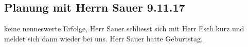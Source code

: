 \documentclass[a4paper,11pt]{article}
\begin{document}
\subsection{Planung mit Herrn Sauer 9.11.17}
keine nenneswerte Erfolge, Herr Sauer schliesst sich mit Herr Esch kurz und meldet sich dann wieder bei uns. Herr Sauer hatte Geburtstag.
\end{document}
